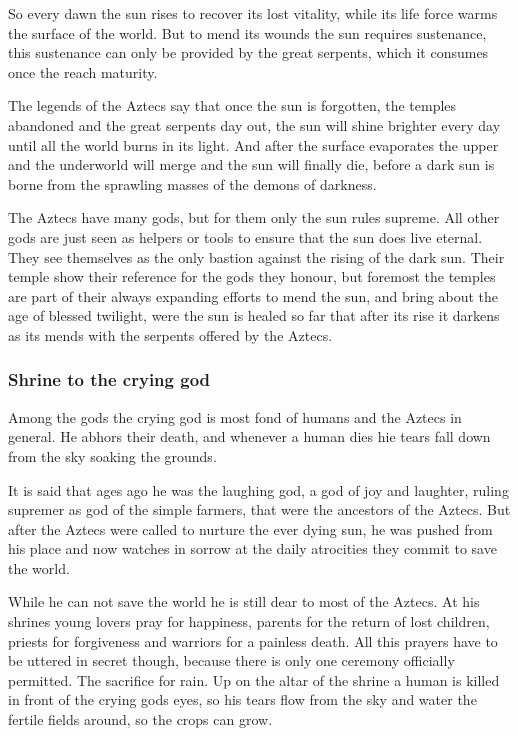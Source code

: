 \documentclass[a4paper]{book}
\begin{document}
		So every dawn the sun rises to recover its lost vitality,
		while its life force warms the surface of the world.
		But to mend its wounds the sun requires sustenance,
		this sustenance can only be provided by the great serpents,
		which it consumes once the reach maturity.

		The legends of the \gls{Aztecs} say that once the sun is forgotten,
		the temples abandoned and the great serpents day out,
		the sun will shine brighter every day until all the world burns in its light.
		And after the surface evaporates the upper and the underworld will merge
		and the sun will finally die,
		before a dark sun is borne from the sprawling masses of the demons of darkness.

		The \gls{Aztecs} have many gods, but for them only the sun rules supreme.
		All other gods are just seen as helpers or tools to ensure that the sun does live eternal.
		They see themselves as the only bastion against the rising of the dark sun.
		Their temple show their reference for the gods they honour,
		but foremost the temples are part of their always expanding efforts to mend the sun,
		and bring about the age of blessed twilight,
		were the sun is healed so far that after its rise it darkens as its mends with the
		serpents offered by the \gls{Aztecs}.

		\subsubsection{Shrine to the crying god}
			Among the gods the crying god is most fond of humans and the \gls{Aztecs} in general.
			He abhors their death, and whenever a human dies hie tears fall down from the sky
			soaking the grounds.

			It is said that ages ago he was the laughing god, a god of joy and laughter,
			ruling supremer as god of the simple farmers,
			that were the ancestors of the \gls{Aztecs}.
			But after the \gls{Aztecs} were called to nurture the ever dying sun,
			he was pushed from his place and now watches in sorrow at the daily atrocities they
			commit to save the world.

			While he can not save the world he is still dear to most of the \gls{Aztecs}.
			At his shrines young lovers pray for happiness,
			parents for the return of lost children,
			priests for forgiveness and warriors for a painless death.
			All this prayers have to be uttered in secret though,
			because there is only one ceremony officially permitted.
			The sacrifice for rain.
			Up on the altar of the shrine a human is killed in front of the crying gods eyes,
			so his tears flow from the sky and water the fertile fields around,
			so the crops can grow.
\end{document}
